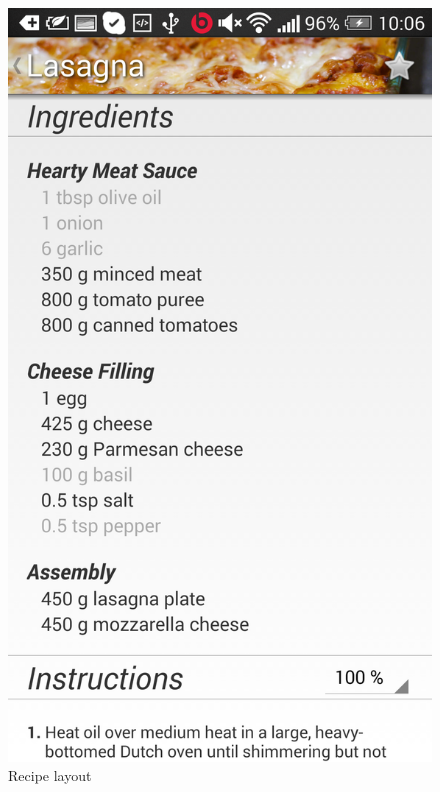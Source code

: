 \begin{figure}[H]
\begin{minipage}[t]{0.5\columnwidth}
\centering
\includegraphics[width=0.7\columnwidth]{img/screenshots/finalrecipe2.png}
\caption{Recipe layout\label{fig:recipe2}}
\end{minipage}
\hspace{0.5cm}
\begin{minipage}[t]{0.5\columnwidth}
\centering

\end{minipage}
\end{figure}
